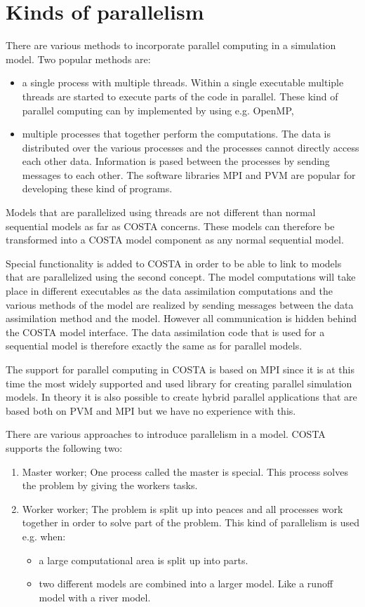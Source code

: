\section{Kinds of parallelism}
There are various methods to incorporate parallel computing in a simulation
model. Two popular methods are:
\begin{itemize}
\item a single process with multiple threads. Within a single executable
      multiple threads are started to execute parts of the
      code in parallel. These kind of parallel computing can by implemented
      by using e.g. OpenMP,
\item multiple processes that together perform the computations. The data
      is distributed over the various processes and the processes cannot
      directly access each other data. Information is pased between the
      processes by sending messages to each other.  The software libraries
      MPI and PVM are popular for developing these kind of programs.
\end{itemize}

Models that are parallelized using threads are not different than normal
sequential models as far as COSTA concerns. These models can therefore be
transformed into a COSTA model component as any normal sequential model.

Special functionality is added to COSTA in order to be able
to link to models that are parallelized using the second concept. The model
computations will take place in different executables as the data
assimilation computations and the various methods of the model are realized
by sending messages between the data assimilation method and the model.
However all communication is hidden behind the COSTA model interface. The
data assimilation code that is used for a sequential model is therefore
exactly the same as for parallel models. 

The support for parallel computing in COSTA is based on MPI since it is at
this time the most widely supported and used library for creating parallel
simulation models. In theory it is also possible to create hybrid parallel
applications that are based both on PVM and MPI but we have no experience
with this. 

There are various approaches to introduce parallelism in a model. COSTA
supports the following two:
\begin{enumerate}
\item Master worker; One process called the master is special. This process
      solves the problem by giving the workers tasks.
\item Worker worker; The problem is split up into peaces and all processes
      work together in order to solve part of the problem. This kind of
      parallelism is used e.g. when:
      \begin{itemize}
      \item a large computational area is split up into parts.
      \item two different models are combined into a larger model. Like a
            runoff model with a river model. 
      \end{itemize}
\end{enumerate}

